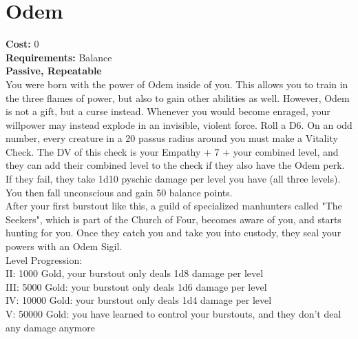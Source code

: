 \section{Odem}
\textbf{Cost:} 0\\
\textbf{Requirements:} Balance\\
\textbf{Passive, Repeatable}\\
You were born with the power of Odem inside of you. This allows you to train in the three flames of power, but also to gain other abilities as well. However, Odem is not a gift, but a curse instead. Whenever you would become enraged, your willpower may instead explode in an invisible, violent force. Roll a D6. On an odd number, every creature in a 20 passus radius around you must make a Vitality Check. The DV of this check is your Empathy + 7 + your combined level, and they can add their combined level to the check if they also have the Odem perk. If they fail, they take 1d10 pyschic damage per level you have (all three levels). You then fall unconscious and gain 50 balance points.\\
After your first burstout like this, a guild of specialized manhunters called "The Seekers", which is part of the Church of Four, becomes aware of you, and starts hunting for you. Once they catch you and take you into custody, they seal your powers with an Odem Sigil.
\\
Level Progression:\\
II: 1000 Gold, your burstout only deals 1d8 damage per level\\
III: 5000 Gold: your burstout only deals 1d6 damage per level\\
IV: 10000 Gold: your burstout only deals 1d4 damage per level\\
V: 50000 Gold: you have learned to control your burstouts, and they don't deal any damage anymore\\